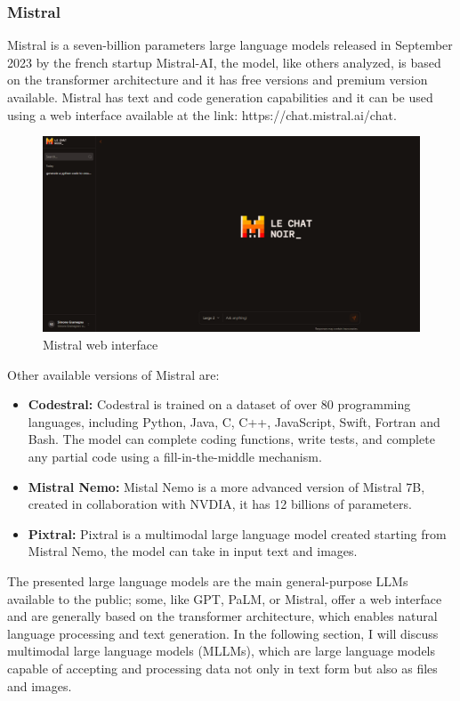\subsubsection{Mistral}
Mistral is a seven-billion parameters large language models released in September 2023 by the french startup Mistral-AI, the model, like others analyzed, is based on the transformer architecture and it has free versions and premium version available.\cite{jiang2023mistral} Mistral has text and code generation capabilities and it can be used using a web interface available at the link: https://chat.mistral.ai/chat. 
\begin{figure}[H]
    \centering
    \includegraphics[width=0.9\linewidth]{Figures/fig_20.png}
    \caption{Mistral web interface}
    \label{fig:enter-label}
\end{figure}
Other available versions of Mistral are:
\begin{itemize}
    \item \textbf{Codestral:} Codestral is trained on a dataset of over 80 programming languages, including Python, Java, C, C++, JavaScript, Swift, Fortran and Bash. The model can complete coding functions, write tests, and complete any partial code using a fill-in-the-middle mechanism. 
    \item \textbf{Mistral Nemo:} Mistal Nemo is a more advanced version of Mistral 7B, created in collaboration with NVDIA, it has 12 billions of parameters.
    \item \textbf{Pixtral:} Pixtral is a multimodal large language model created starting from Mistral Nemo, the model can take in input text and images.
\end{itemize}
The presented large language models are the main general-purpose LLMs available to the public; some, like GPT, PaLM, or Mistral, offer a web interface and are generally based on the transformer architecture, which enables natural language processing and text generation. In the following section, I will discuss multimodal large language models (MLLMs), which are large language models capable of accepting and processing data not only in text form but also as files and images.

